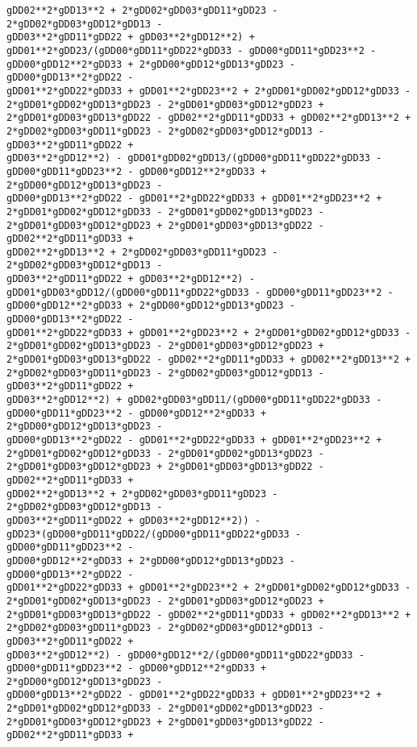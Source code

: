 \documentclass[landscape,letterpaper,10pt,english]{article}
\begin{document}
\begin{Verbatim}[commandchars=\\\{\}]
gDD02**2*gDD13**2 + 2*gDD02*gDD03*gDD11*gDD23 - 2*gDD02*gDD03*gDD12*gDD13 -
gDD03**2*gDD11*gDD22 + gDD03**2*gDD12**2) +
gDD01**2*gDD23/(gDD00*gDD11*gDD22*gDD33 - gDD00*gDD11*gDD23**2 -
gDD00*gDD12**2*gDD33 + 2*gDD00*gDD12*gDD13*gDD23 - gDD00*gDD13**2*gDD22 -
gDD01**2*gDD22*gDD33 + gDD01**2*gDD23**2 + 2*gDD01*gDD02*gDD12*gDD33 -
2*gDD01*gDD02*gDD13*gDD23 - 2*gDD01*gDD03*gDD12*gDD23 +
2*gDD01*gDD03*gDD13*gDD22 - gDD02**2*gDD11*gDD33 + gDD02**2*gDD13**2 +
2*gDD02*gDD03*gDD11*gDD23 - 2*gDD02*gDD03*gDD12*gDD13 - gDD03**2*gDD11*gDD22 +
gDD03**2*gDD12**2) - gDD01*gDD02*gDD13/(gDD00*gDD11*gDD22*gDD33 -
gDD00*gDD11*gDD23**2 - gDD00*gDD12**2*gDD33 + 2*gDD00*gDD12*gDD13*gDD23 -
gDD00*gDD13**2*gDD22 - gDD01**2*gDD22*gDD33 + gDD01**2*gDD23**2 +
2*gDD01*gDD02*gDD12*gDD33 - 2*gDD01*gDD02*gDD13*gDD23 -
2*gDD01*gDD03*gDD12*gDD23 + 2*gDD01*gDD03*gDD13*gDD22 - gDD02**2*gDD11*gDD33 +
gDD02**2*gDD13**2 + 2*gDD02*gDD03*gDD11*gDD23 - 2*gDD02*gDD03*gDD12*gDD13 -
gDD03**2*gDD11*gDD22 + gDD03**2*gDD12**2) -
gDD01*gDD03*gDD12/(gDD00*gDD11*gDD22*gDD33 - gDD00*gDD11*gDD23**2 -
gDD00*gDD12**2*gDD33 + 2*gDD00*gDD12*gDD13*gDD23 - gDD00*gDD13**2*gDD22 -
gDD01**2*gDD22*gDD33 + gDD01**2*gDD23**2 + 2*gDD01*gDD02*gDD12*gDD33 -
2*gDD01*gDD02*gDD13*gDD23 - 2*gDD01*gDD03*gDD12*gDD23 +
2*gDD01*gDD03*gDD13*gDD22 - gDD02**2*gDD11*gDD33 + gDD02**2*gDD13**2 +
2*gDD02*gDD03*gDD11*gDD23 - 2*gDD02*gDD03*gDD12*gDD13 - gDD03**2*gDD11*gDD22 +
gDD03**2*gDD12**2) + gDD02*gDD03*gDD11/(gDD00*gDD11*gDD22*gDD33 -
gDD00*gDD11*gDD23**2 - gDD00*gDD12**2*gDD33 + 2*gDD00*gDD12*gDD13*gDD23 -
gDD00*gDD13**2*gDD22 - gDD01**2*gDD22*gDD33 + gDD01**2*gDD23**2 +
2*gDD01*gDD02*gDD12*gDD33 - 2*gDD01*gDD02*gDD13*gDD23 -
2*gDD01*gDD03*gDD12*gDD23 + 2*gDD01*gDD03*gDD13*gDD22 - gDD02**2*gDD11*gDD33 +
gDD02**2*gDD13**2 + 2*gDD02*gDD03*gDD11*gDD23 - 2*gDD02*gDD03*gDD12*gDD13 -
gDD03**2*gDD11*gDD22 + gDD03**2*gDD12**2)) -
gDD23*(gDD00*gDD11*gDD22/(gDD00*gDD11*gDD22*gDD33 - gDD00*gDD11*gDD23**2 -
gDD00*gDD12**2*gDD33 + 2*gDD00*gDD12*gDD13*gDD23 - gDD00*gDD13**2*gDD22 -
gDD01**2*gDD22*gDD33 + gDD01**2*gDD23**2 + 2*gDD01*gDD02*gDD12*gDD33 -
2*gDD01*gDD02*gDD13*gDD23 - 2*gDD01*gDD03*gDD12*gDD23 +
2*gDD01*gDD03*gDD13*gDD22 - gDD02**2*gDD11*gDD33 + gDD02**2*gDD13**2 +
2*gDD02*gDD03*gDD11*gDD23 - 2*gDD02*gDD03*gDD12*gDD13 - gDD03**2*gDD11*gDD22 +
gDD03**2*gDD12**2) - gDD00*gDD12**2/(gDD00*gDD11*gDD22*gDD33 -
gDD00*gDD11*gDD23**2 - gDD00*gDD12**2*gDD33 + 2*gDD00*gDD12*gDD13*gDD23 -
gDD00*gDD13**2*gDD22 - gDD01**2*gDD22*gDD33 + gDD01**2*gDD23**2 +
2*gDD01*gDD02*gDD12*gDD33 - 2*gDD01*gDD02*gDD13*gDD23 -
2*gDD01*gDD03*gDD12*gDD23 + 2*gDD01*gDD03*gDD13*gDD22 - gDD02**2*gDD11*gDD33 +

\end{Verbatim}
\end{document}
